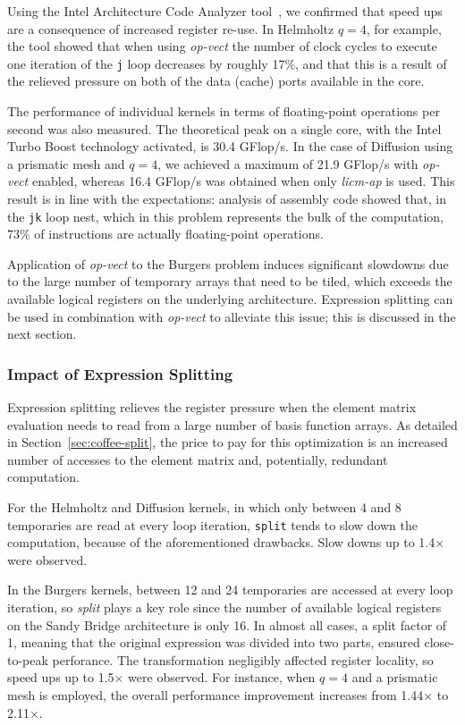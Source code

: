 Using the Intel Architecture Code Analyzer tool~\cite{IACA}, we confirmed that speed ups are a consequence of increased register re-use. In Helmholtz $q=4$, for example, the tool showed that when using \emph{op-vect} the number of clock cycles to execute one iteration of the \texttt{j} loop decreases by roughly 17$\%$, and that this is a result of the relieved pressure on both of the data (cache) ports available in the core.

The performance of individual kernels in terms of floating-point operations per second was also measured. The theoretical peak on a single core, with the Intel Turbo Boost technology activated, is 30.4 GFlop/s. In the case of Diffusion using a prismatic mesh and $q=4$, we achieved a maximum of 21.9 GFlop/s with \emph{op-vect} enabled, whereas 16.4 GFlop/s was obtained when only \emph{licm-ap} is used. This result is in line with the expectations: analysis of assembly code showed that, in the \texttt{jk} loop nest, which in this problem represents the bulk of the computation, 73$\%$ of instructions are actually floating-point operations.

Application of \emph{op-vect} to the Burgers problem induces significant slowdowns due to the large number of temporary arrays that need to be tiled, which exceeds the available logical registers on the underlying architecture. Expression splitting can be used in combination with \emph{op-vect} to alleviate this issue; this is discussed in the next section.


\subsubsection{Impact of Expression Splitting}
\label{sec:perf-results-split} 
Expression splitting relieves the register pressure when the element matrix evaluation needs to read from a large number of basis function arrays. As detailed in Section~\ref{sec:coffee-split}, the price to pay for this optimization is an increased number of accesses to the element matrix and, potentially, redundant computation. 

For the Helmholtz and Diffusion kernels, in which only between 4 and 8 temporaries are read at every loop iteration, \texttt{split} tends to slow down the computation, because of the aforementioned drawbacks. Slow downs up to 1.4$\times$ were observed. 

In the Burgers kernels, between 12 and 24 temporaries are accessed at every loop iteration, so \emph{split} plays a key role since the number of available logical registers on the Sandy Bridge architecture is only 16. In almost all cases, a split factor of 1, meaning that the original expression was divided into two parts, ensured close-to-peak perforance. The transformation negligibly affected register locality, so speed ups up to 1.5$\times$ were observed. For instance, when $q=4$ and a prismatic mesh is employed, the overall performance improvement increases from 1.44$\times$ to 2.11$\times$. 

